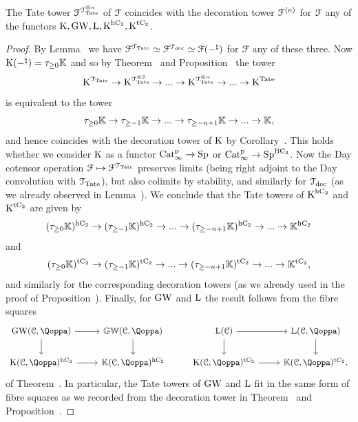 \begin{corollary}
\label{corollary:two-towers}%
The Tate tower $\mathcal{F}^{\mathcal{T}_{\operatorname{Tate}}^{\otimes n}}$ of $\mathcal{F}$ coincides with the decoration tower $\mathcal{F}^{\langle n\rangle}$ for $\mathcal{F}$ any of the functors $\operatorname K,\operatorname{GW},\operatorname L,\operatorname K^{{\mathrm{h}\mathrm{C_2}}},\operatorname K^{{\mathrm{t}\mathrm{C_2}}}$.
\end{corollary}
\begin{proof}
By Lemma~
we have $\mathcal{F}^{\mathcal{T}_{\operatorname{Tate}}} \simeq \mathcal{F}^{\mathcal{T}_{\mathrm{dec}}} \simeq \mathcal{F}(-^{\natural})$ for $\mathcal{F}$ any of these three. Now $\operatorname K(-^{\natural}) = \tau_{\geq 0}\mathbb K$ and so by Theorem~ and Proposition~ the tower
\[
\operatorname K^{\mathcal{T}_{\operatorname{Tate}}} \to \operatorname K^{\mathcal{T}_{\operatorname{Tate}}^{\otimes 2}} \to ... \to \operatorname K^{\mathcal{T}_{\operatorname{Tate}}^{\otimes n}} \to ... \to \operatorname K^{\operatorname{Tate}}
\]
is equivalent to the tower
\[
\tau_{\geq 0}\mathbb K \to \tau_{\geq -1}\mathbb K \to ... \to \tau_{\geq -n+1}\mathbb K \to ... \to \mathbb K ,
\]
and hence coincides with the decoration tower of $\operatorname K$ by Corollary~. This holds whether we consider $\operatorname K$ as a functor $\mathrm{Cat}^{\mathrm p}_\infty \to \mathrm{Sp}$ or $\mathrm{Cat}^{\mathrm p}_\infty \to \mathrm{Sp}^{\mathrm{B}\mathrm{C_2}}$. 
Now the Day cotensor operation $\mathcal{F} \mapsto \mathcal{F}^{\mathcal{T}_{\operatorname{Tate}}}$ preserves limits (being right adjoint to the Day convolution with $\mathcal{T}_{\operatorname{Tate}}$), but also colimits by stability, and similarly for $\mathcal{T}_{\mathrm{dec}}$ (as we already observed in Lemma~). We conclude that the Tate towers of $\operatorname K^{{\mathrm{h}\mathrm{C_2}}}$ and $\operatorname K^{{\mathrm{t}\mathrm{C_2}}}$ are given by
\[
(\tau_{\geq 0}\mathbb K)^{{\mathrm{h}\mathrm{C_2}}} \to (\tau_{\geq -1}\mathbb K)^{{\mathrm{h}\mathrm{C_2}}} \to ... \to (\tau_{\geq -n+1}\mathbb K)^{{\mathrm{h}\mathrm{C_2}}} \to ... \to \mathbb K^{{\mathrm{h}\mathrm{C_2}}}
\]
and
\[
(\tau_{\geq 0}\mathbb K)^{{\mathrm{t}\mathrm{C_2}}} \to (\tau_{\geq -1}\mathbb K)^{{\mathrm{t}\mathrm{C_2}}} \to ... \to (\tau_{\geq -n+1}\mathbb K)^{{\mathrm{t}\mathrm{C_2}}} \to ... \to \mathbb K^{{\mathrm{t}\mathrm{C_2}}} ,
\]
and similarly for the corresponding decoration towers (as we already used in the proof of Proposition~). Finally, for $\operatorname{GW}$ and $\operatorname L$ the result follows from the fibre squares
\[
\begin{tikzcd}
\GW(\C,\QF)\ar[r]\ar[d] & \KGW(\C,\QF)\ar[d] & \L(\C) \ar[r] \ar[d] & \KL(\C,\QF) \ar[d] \\
\K(\C,\QF)^\hC\ar[r] & \KK(\C,\QF)^\hC & \K(\C,\QF)^\tC \ar[r] & \KK(\C,\QF)^{\tC}.
\end{tikzcd}
\]
of Theorem~. In particular, the Tate towers of $\operatorname{GW}$ and $\operatorname L$ fit in the same form of fibre squares as we recorded from the decoration tower in Theorem~ and Proposition~.
\end{proof}


